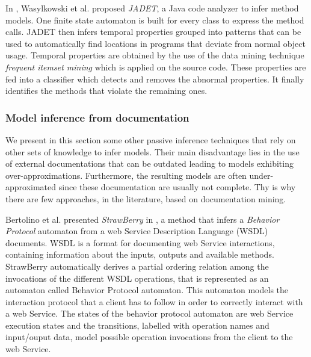 In \cite{Wasylkowski07detectingobject}, Wasylkowski et al.
proposed \textit{JADET}, a Java code analyzer to infer method models. One finite state automaton is built for every class to express the method calls. JADET then infers temporal properties grouped into patterns that can be used to automatically find locations in programs that deviate from normal object
usage. Temporal properties are obtained by the use of the data mining technique \textit{frequent itemset mining}  which is applied on the source code. These properties are fed into a classifier which detects and removes the abnormal properties. It finally identifies the methods that violate the remaining ones.

\subsubsection{Model inference from documentation}
\label{sec:passive-others}

We present in this section some other passive inference techniques that rely on other sets of
knowledge to infer models. Their main disadvantage lies in the use of external documentations that can be outdated leading to models exhibiting over-approximations. Furthermore, the resulting models are often under-approximated since these documentation are usually not complete. Thy is why there are few approaches, in the literature, based on documentation mining.



Bertolino et al. presented \textit{StrawBerry} in
\cite{Bertolino:2009:ASB:1595696.1595719}, a method that infers a
\textit{Behavior Protocol} automaton from a web Service
Description Language (WSDL) documents.  WSDL is a format for
documenting web Service interactions, containing information
about the inputs, outputs and available methods. StrawBerry
automatically derives a partial ordering relation among the
invocations of the different WSDL operations, that is represented
as an automaton called Behavior Protocol automaton.  This
automaton models the interaction protocol that a client has to
follow in order to correctly interact with a web Service.  The
states of the behavior protocol automaton are web Service
execution states and the transitions, labelled with operation
names and input/ouput data, model possible operation invocations
from the client to the web Service.

